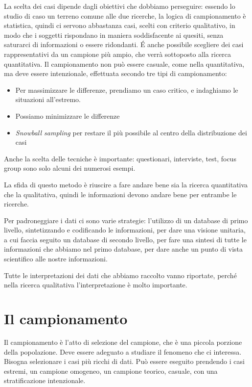 La scelta dei casi dipende dagli obiettivi che dobbiamo perseguire: essendo lo studio di caso un terreno comune alle due ricerche, la logica di campionamento è statistica, quindi ci servono abbastanza casi, scelti con criterio qualitativo, in modo che i soggetti rispondano in maniera soddisfacente ai quesiti, senza saturarci di informazioni o essere ridondanti. \'E anche possibile scegliere dei casi rappresentativi da un campione più ampio, che verrà sottoposto alla ricerca quantitativa. Il campionamento non può essere casuale, come nella quantitativa, ma deve essere intenzionale, effettuata secondo tre tipi di campionamento:
\begin{itemize}
\item Per massimizzare le differenze, prendiamo un caso critico, e indaghiamo le situazioni all'estremo.
\item Possiamo minimizzare le differenze
\item \textit{Snowball sampling} per restare il più possibile al centro della distribuzione dei casi
\end{itemize}

Anche la scelta delle tecniche è importante: questionari, interviste, test, focus group sono solo alcuni dei numerosi esempi.

La sfida di questo metodo è riuscire a fare andare bene sia la ricerca quantitativa che la qualitativa, quindi le informazioni devono andare bene per entrambe le ricerche.

Per padroneggiare i dati ci sono varie strategie: l'utilizzo di un database di primo livello, sintetizzando e codificando le informazioni, per dare una visione unitaria, a cui faccia seguito un database di secondo livello, per fare una sintesi di tutte le informazioni che abbiamo nel primo database, per dare anche un punto di vista scientifico alle nostre informazioni.

Tutte le interpretazioni dei dati che abbiamo raccolto vanno riportate, perché nella ricerca qualitativa l'interpretazione è molto importante. 

\section{Il campionamento}
Il campionamento è l'atto di selezione del campione, che è una piccola porzione della popolazione. Deve essere adeguato a studiare il fenomeno che ci interessa.
Bisogna selezionare i casi più ricchi di dati. Può essere eseguito prendendo i casi estremi, un campione omogeneo, un campione teorico, casuale, con una stratificazione intenzionale.
